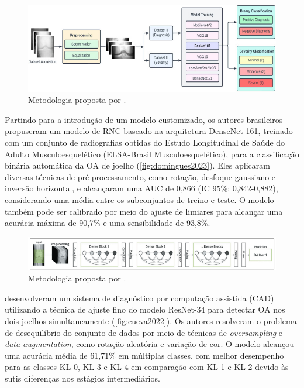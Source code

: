\begin{figure}[!htbp]
    \centering
    \includegraphics[width=\textwidth]{figs/mohammed2023.jpg}
    \caption{Metodologia proposta por .}
    \label{fig:mohammed2023}
\end{figure}

Partindo para a introdução de um modelo customizado, os autores brasileiros  propuseram um modelo de RNC baseado na arquitetura DenseNet-161, treinado com um conjunto de radiografias obtidas do Estudo Longitudinal de Saúde do Adulto Musculoesquelético (ELSA-Brasil Musculoesquelético), para a classificação binária automática da OA de joelho (\autoref{fig:domingues2023}). Eles aplicaram diversas técnicas de pré-processamento, como rotação, desfoque gaussiano e inversão horizontal, e alcançaram uma AUC de 0,866 (IC 95\%: 0,842-0,882), considerando uma média entre os subconjuntos de treino e teste. O modelo também pode ser calibrado por meio do ajuste de limiares para alcançar uma acurácia máxima de 90,7\% e uma sensibilidade de 93,8\%.

\begin{figure}[!htbp]
    \centering
    \includegraphics[width=\textwidth]{figs/domingues2023.png}
    \caption{Metodologia proposta por .}
    \label{fig:domingues2023}
\end{figure}

 desenvolveram um sistema de diagnóstico por computação assistida (CAD) utilizando a técnica de ajuste fino do modelo ResNet-34 para detectar OA nos dois joelhos simultaneamente (\autoref{fig:cueva2022}). Os autores resolveram o problema de desequilíbrio do conjunto de dados por meio de técnicas de \textit{oversampling} e \textit{data augmentation}, como rotação aleatória e variação de cor. O modelo alcançou uma acurácia média de 61,71\% em múltiplas classes, com melhor desempenho para as classes KL-0, KL-3 e KL-4 em comparação com KL-1 e KL-2 devido às sutis diferenças nos estágios intermediários.

